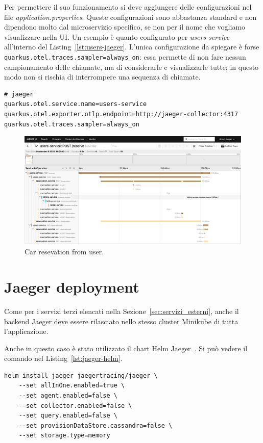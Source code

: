 Per permettere il suo funzionamento si deve aggiungere delle configurazioni nel file \textit{application.properties}. Queste configurazioni sono abbastanza standard e non dipendono molto dal microservizio specifico, se non per il nome che vogliamo visualizzare nella UI. Un esempio è quanto configurato per \textit{users-service} all'interno del Listing~\ref{lst:users-jaeger}. L'unica configurazione da spiegare è forse \texttt{quarkus.otel.traces.sampler=always\_on}: essa permette di non fare nessun campionamento delle chiamate, ma di considerarle e visualizzarle tutte; in questo modo non si rischia di interrompere una sequenza di chiamate.
\begin{lstlisting}[caption=Jaeger configuration for \textit{users-service}, label=lst:users-jaeger]
# jaeger
quarkus.otel.service.name=users-service
quarkus.otel.exporter.otlp.endpoint=http://jaeger-collector:4317
quarkus.otel.traces.sampler=always_on
\end{lstlisting}

\begin{figure}[htbp]
    \centering
    \includegraphics[width=.9\textwidth]{images/4-tracing/jaeger use case.pdf}
    \caption{Car resevation from user.}
    \label{fig:jaeger_usecases}
\end{figure}

\section{Jaeger deployment}
Come per i servizi terzi elencati nella Sezione~\ref{sec:servizi_esterni}, anche il backend Jaeger deve essere rilasciato nello stesso cluster Minikube di tutta l'applicazione.

Anche in questo caso è stato utilizzato il chart Helm Jaeger~\cite{jaeger_helm}. Si può vedere il comando nel Listing~\ref{lst:jaeger-helm}.
\begin{lstlisting}[caption=Install Jaeger chart for \textit{users-service}, label=lst:jaeger-helm]
helm install jaeger jaegertracing/jaeger \
    --set allInOne.enabled=true \
    --set agent.enabled=false \
    --set collector.enabled=false \
    --set query.enabled=false \
    --set provisionDataStore.cassandra=false \
    --set storage.type=memory
\end{lstlisting}

